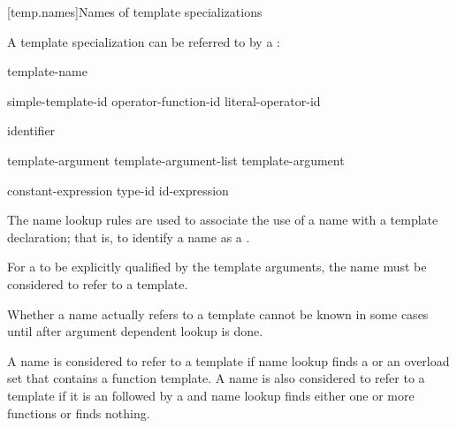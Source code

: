[temp.names]{Names of template specializations}

\pnum
A template specialization can be referred to by a
:

\begin{bnf}
\br
  template-name \terminal{<}  \terminal{>}
\end{bnf}

\begin{bnf}
\br
  simple-template-id\br
  operator-function-id \terminal{<}  \terminal{>}\br
  literal-operator-id \terminal{<}  \terminal{>}
\end{bnf}

\begin{bnf}
\br
  identifier
\end{bnf}

\begin{bnf}
\br
  template-argument \br
  template-argument-list \terminal{,} template-argument 
\end{bnf}

\begin{bnf}
\br
  constant-expression\br
  type-id\br
  id-expression
\end{bnf}

\begin{note}
The name lookup rules are used to associate the use of
a name with a template declaration;
that is, to identify a name as a
.
\end{note}

\pnum
For a
to be explicitly qualified by the template arguments,
the name must be considered to refer to a template.
\begin{note}
Whether a name actually refers to a template
cannot be known in some cases
until after argument dependent lookup is done.
\end{note}
A name is considered to refer to a template if
name lookup finds
a 
or an overload set that contains a function template.
A name is also considered to refer to a template if
it is an 
followed by a \tcode{<}
and name lookup finds either one or more functions or finds nothing.

